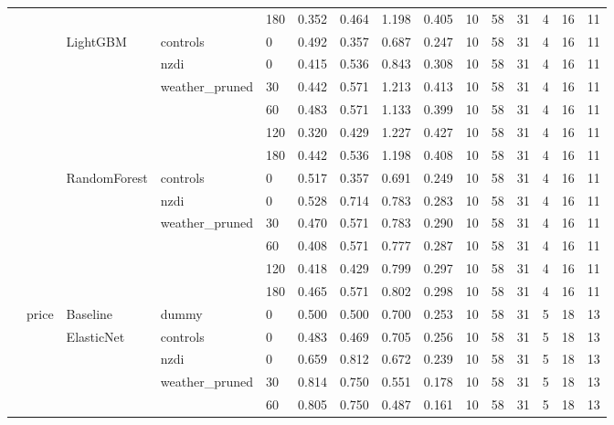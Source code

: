 \begin{longtable}{lllllrrrrrrrrrr}
 &  &  &  & 180 & 0.352 & 0.464 & 1.198 & 0.405 & 10 & 58 & 31 & 4 & 16 & 11 \\
\cline{3-15} \cline{4-15}
 &  & \multirow[t]{6}{*}{LightGBM} & controls & 0 & 0.492 & 0.357 & 0.687 & 0.247 & 10 & 58 & 31 & 4 & 16 & 11 \\
\cline{4-15}
 &  &  & nzdi & 0 & 0.415 & 0.536 & 0.843 & 0.308 & 10 & 58 & 31 & 4 & 16 & 11 \\
\cline{4-15}
 &  &  & \multirow[t]{4}{*}{weather_pruned} & 30 & 0.442 & 0.571 & 1.213 & 0.413 & 10 & 58 & 31 & 4 & 16 & 11 \\
 &  &  &  & 60 & 0.483 & 0.571 & 1.133 & 0.399 & 10 & 58 & 31 & 4 & 16 & 11 \\
 &  &  &  & 120 & 0.320 & 0.429 & 1.227 & 0.427 & 10 & 58 & 31 & 4 & 16 & 11 \\
 &  &  &  & 180 & 0.442 & 0.536 & 1.198 & 0.408 & 10 & 58 & 31 & 4 & 16 & 11 \\
\cline{3-15} \cline{4-15}
 &  & \multirow[t]{6}{*}{RandomForest} & controls & 0 & 0.517 & 0.357 & 0.691 & 0.249 & 10 & 58 & 31 & 4 & 16 & 11 \\
\cline{4-15}
 &  &  & nzdi & 0 & 0.528 & 0.714 & 0.783 & 0.283 & 10 & 58 & 31 & 4 & 16 & 11 \\
\cline{4-15}
 &  &  & \multirow[t]{4}{*}{weather_pruned} & 30 & 0.470 & 0.571 & 0.783 & 0.290 & 10 & 58 & 31 & 4 & 16 & 11 \\
 &  &  &  & 60 & 0.408 & 0.571 & 0.777 & 0.287 & 10 & 58 & 31 & 4 & 16 & 11 \\
 &  &  &  & 120 & 0.418 & 0.429 & 0.799 & 0.297 & 10 & 58 & 31 & 4 & 16 & 11 \\
 &  &  &  & 180 & 0.465 & 0.571 & 0.802 & 0.298 & 10 & 58 & 31 & 4 & 16 & 11 \\
\cline{2-15} \cline{3-15} \cline{4-15}
 & \multirow[t]{31}{*}{price} & Baseline & dummy & 0 & 0.500 & 0.500 & 0.700 & 0.253 & 10 & 58 & 31 & 5 & 18 & 13 \\
\cline{3-15} \cline{4-15}
 &  & \multirow[t]{6}{*}{ElasticNet} & controls & 0 & 0.483 & 0.469 & 0.705 & 0.256 & 10 & 58 & 31 & 5 & 18 & 13 \\
\cline{4-15}
 &  &  & nzdi & 0 & 0.659 & 0.812 & 0.672 & 0.239 & 10 & 58 & 31 & 5 & 18 & 13 \\
\cline{4-15}
 &  &  & \multirow[t]{4}{*}{weather_pruned} & 30 & 0.814 & 0.750 & 0.551 & 0.178 & 10 & 58 & 31 & 5 & 18 & 13 \\
 &  &  &  & 60 & 0.805 & 0.750 & 0.487 & 0.161 & 10 & 58 & 31 & 5 & 18 & 13 \\

\end{longtable}
